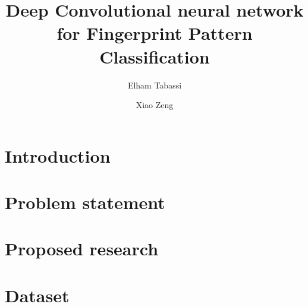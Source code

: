 \documentclass[10pt,twocolumn,letterpaper]{article}
\begin{document}
\title{Deep Convolutional neural network for Fingerprint Pattern Classification}

\author{Elham Tabassi \and Xiao Zeng \\}

\maketitle


%

\section{Introduction}




%

\section{Problem statement}


\section{Proposed research}




\section{Dataset}









{\small


}
\end{document}

